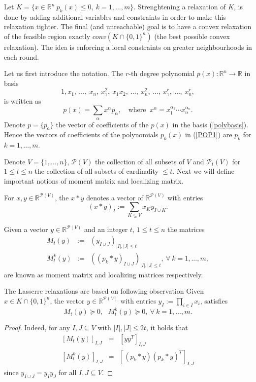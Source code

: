 \documentclass[12pt]{book}
\theoremstyle{definition}
\begin{document}
Let $K = \{ x\in \mathbb{R}^n \ p_k(x)\leq 0, \ k=1,\dots ,m \}$. Strenghtening a relaxation of $K$, is done by adding additional variables and constraints in order to make this relaxation tighter. The final (and unreachable) goal is to have a convex relaxation of the feasible region exactly $conv(K \cap \{0,1\}^n)$ (the best possible convex relaxation).  The idea is enforcing a local constraints on greater neighbourhoods in each round. 

Let us first introduce the notation. The $r$-th degree polynomial $p(x):\mathbb{R}^n\rightarrow\mathbb{R}$ in basis 
\begin{equation}
\label{polybasis}
1,x_1,\ \dots ,\ x_n,\ x_1^2,\ x_1x_2,\ \dots ,\ x_n^2,\ \dots ,\ x_1^r,\ \dots ,\ x_n^r,
\end{equation}
is written as 
$$p(x) = \sum_\alpha x^\alpha p_\alpha, \ \ \ \mbox{ where } \ x^\alpha = x_1^{\alpha_1}\cdots x_n^{\alpha_n}. $$
Denote $p = \{p_a\}$ the vector of coefficients of the $p(x)$ in the basis (\ref{polybasis}). Hence the vectors of coefficients of the polynomials $p_k(x)$ in (\ref{POP1}) are $p_k$ for $k=1,\dots ,m$.

Denote $V = \{ 1,\dots ,n\}$,  $\mathcal{P}(V)$ the collection of all subsets of $V$ and $\mathcal{P}_t(V)$ for $1\leq t\leq n$ the collection of all subsets of cardinality $\leq t$. 
Next we will define important notions of moment matrix and localizing matrix.


For $x,y\in \mathbb{R}^{\mathcal{P}(V)}$, the $x*y$ denotes a vector of $\mathbb{R}^{\mathcal{P}(V)}$
with entries 
\begin{equation}
(x*y)_I := \sum_{K\subseteq V} x_K y_{I\cup K}.
\end{equation}

Given a vector $y\in \mathbb{R}^{\mathcal{P}(V)}$  and an integer $t$, $1\leq t\leq n$
the matrices \begin{eqnarray}
M_t(y) &:=& (y_{I\cup J})_{\vert I\vert ,\vert J\vert \leq t} \\
M_t^k(y) &:=& \left((p_k*y)_{I\cup J}\right)_{\vert I\vert ,\vert J\vert \leq t} , \ \forall \ k=1,\dots ,m,
\end{eqnarray}
are known as moment matrix and localizing matrices respectively.

The Lasserre relaxations are based on following observation
\lema Given $x\in K\cap \{ 0,1\}^n$, the vector $y\in \mathbb{R}^{\mathcal{P}(V)}$ with entries $y_I:=\prod_{i\in I} x_i$, satisfies $$M_t(y)\succeq 0, \ \ \ M_t^k(y)\succeq 0, \ \forall \ k=1,\dots ,m.$$
\rm
\begin{proof}
Indeed, for any $I,J\subseteq V$ with $\vert I\vert, \vert J\vert \leq 2t$, it holds that
\begin{eqnarray*}
\left[M_t(y)\right]_{I,J} &=& [yy^T]_{I,J} \\
\left[M_t^k(y)\right]_{I,J} &=& \left[(p_k*y)(p_k*y)^T\right]_{I,J}
\end{eqnarray*}
since $y_{I\cup J} = y_I y_J$ for all $I,J\subseteq V$. 
\end{proof}
\end{document}
